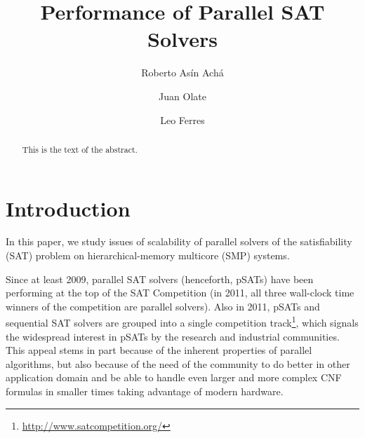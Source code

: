 \documentclass{llncs}
\begin{document}



\newcommand{\barc}{Barelogic$^S$}
\title{Performance of Parallel SAT Solvers}

\author{Roberto As\'in Ach\'a \and Juan Olate  \and Leo Ferres }



\maketitle

\begin{abstract}
This is the text of the abstract.
\end{abstract}

\section{Introduction}

In this paper, we study issues of scalability of parallel solvers of
the satisfiability (SAT) problem on hierarchical-memory multicore
(SMP) systems.

Since at least 2009, parallel SAT solvers (henceforth, pSATs) have
been performing at the top of the SAT Competition (in 2011, all three
wall-clock time winners of the competition are parallel solvers).
Also in 2011, pSATs and sequential SAT solvers are grouped into a
single competition
track\footnote{\url{http://www.satcompetition.org/}}, which signals
the widespread interest in pSATs by the research and industrial
communities. This appeal stems in part because of the inherent
properties of parallel algorithms, but also because of the need of 
the community to do better in other application domain and be able to 
handle even larger and more complex CNF formulas in smaller times 
taking advantage of modern hardware. 
\end{document}
